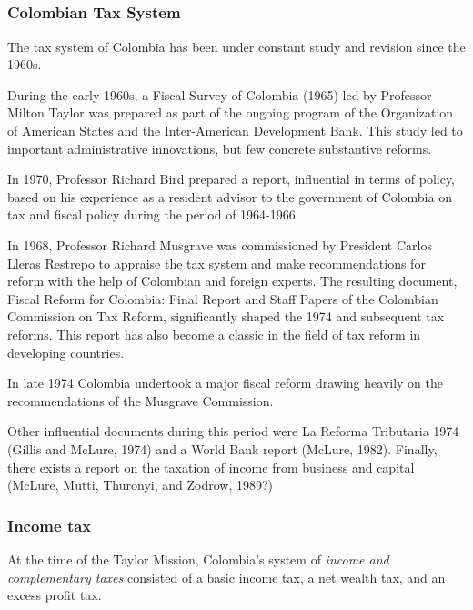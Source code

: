 \documentclass[
  12pt]{article}
\theoremstyle{definition}
\theoremstyle{remark}
\begin{document}
\subsection{\texorpdfstring{\citet{McLure1989}}{@McLure1989}}\label{mclure1989}

\subsubsection{Colombian Tax System}\label{colombian-tax-system}

The tax system of Colombia has been under constant study and revision
since the 1960s.

During the early 1960s, a Fiscal Survey of Colombia (1965) led by
Professor Milton Taylor was prepared as part of the ongoing program of
the Organization of American States and the Inter-American Development
Bank. This study led to important administrative innovations, but few
concrete substantive reforms.

In 1970, Professor Richard Bird prepared a report, influential in terms
of policy, based on his experience as a resident advisor to the
government of Colombia on tax and fiscal policy during the period of
1964-1966.

In 1968, Professor Richard Musgrave was commissioned by President Carlos
Lleras Restrepo to appraise the tax system and make recommendations for
reform with the help of Colombian and foreign experts. The resulting
document, Fiscal Reform for Colombia: Final Report and Staff Papers of
the Colombian Commission on Tax Reform, significantly shaped the 1974
and subsequent tax reforms. This report has also become a classic in the
field of tax reform in developing countries.

In late 1974 Colombia undertook a major fiscal reform drawing heavily on
the recommendations of the Musgrave Commission.

Other influential documents during this period were La Reforma
Tributaria 1974 (Gillis and McLure, 1974) and a World Bank report
(McLure, 1982). Finally, there exists a report on the taxation of income
from business and capital (McLure, Mutti, Thuronyi, and Zodrow, 1989?)

\subsubsection{Income tax}\label{income-tax}

At the time of the Taylor Mission, Colombia's system of \emph{income and
complementary taxes} consisted of a basic income tax, a net wealth tax,
and an excess profit tax.
\end{document}
